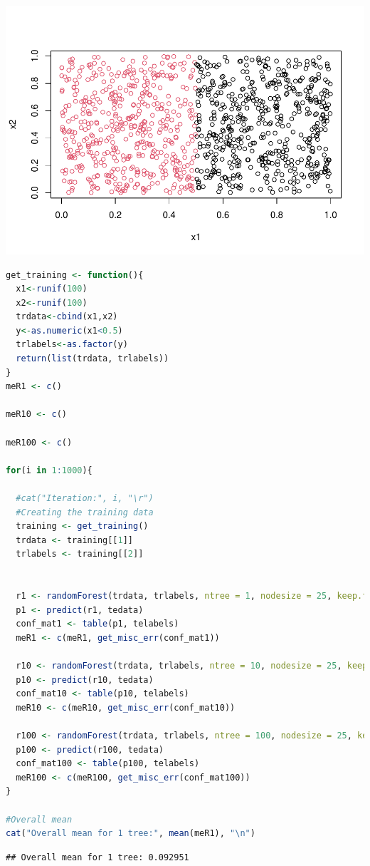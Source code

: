 \documentclass[
]{article}
\begin{document}
\includegraphics{Block2Lab1_files/figure-latex/1.3-1.pdf}

\begin{lstlisting}[language=R]
get_training <- function(){
  x1<-runif(100)
  x2<-runif(100)
  trdata<-cbind(x1,x2)
  y<-as.numeric(x1<0.5)
  trlabels<-as.factor(y)
  return(list(trdata, trlabels))
}
meR1 <- c()

meR10 <- c()

meR100 <- c()

for(i in 1:1000){
  
  #cat("Iteration:", i, "\r")
  #Creating the training data
  training <- get_training()
  trdata <- training[[1]]
  trlabels <- training[[2]]
  
  
  r1 <- randomForest(trdata, trlabels, ntree = 1, nodesize = 25, keep.forest = TRUE)
  p1 <- predict(r1, tedata)
  conf_mat1 <- table(p1, telabels)
  meR1 <- c(meR1, get_misc_err(conf_mat1))
  
  r10 <- randomForest(trdata, trlabels, ntree = 10, nodesize = 25, keep.forest = TRUE)
  p10 <- predict(r10, tedata)
  conf_mat10 <- table(p10, telabels)
  meR10 <- c(meR10, get_misc_err(conf_mat10))
  
  r100 <- randomForest(trdata, trlabels, ntree = 100, nodesize = 25, keep.forest = TRUE)
  p100 <- predict(r100, tedata)
  conf_mat100 <- table(p100, telabels)
  meR100 <- c(meR100, get_misc_err(conf_mat100))
}

#Overall mean
cat("Overall mean for 1 tree:", mean(meR1), "\n")
\end{lstlisting}

\begin{lstlisting}
## Overall mean for 1 tree: 0.092951
\end{lstlisting}
\end{document}

